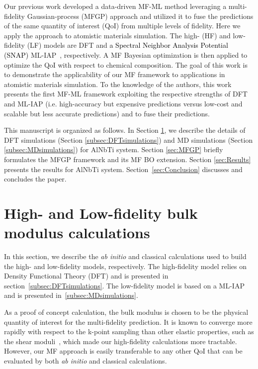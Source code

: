 \documentclass[%
 reprint,
aip,jcp
]{revtex4-1}
\newcommand{\review}[1]{\textcolor{black}{#1}}
\begin{document}
Our previous work developed a data-driven MF-ML method leveraging a
multi-fidelity Gaussian-process (MFGP) approach 
\cite{tran2019sbfbo2cogp,tran2020smfbo2cogp}
and utilized it to fuse the predictions of the same quantity of interest 
(QoI) from multiple levels of fidelity. 
Here we apply the approach to atomistic materials simulation.
The high- (HF) and low-fidelity (LF) models are 
DFT and \review{a Spectral Neighbor Analysis Potential (SNAP)} 
ML-IAP~\cite{thompson2015spectral}, respectively. 
A MF Bayesian optimization is then applied to optimize the QoI with 
respect to chemical composition. 
The goal of this work is to demonstrate the applicability of our 
MF framework to applications in atomistic materials simulation.
To the knowledge of the authors, this work presents the first 
MF-ML framework exploiting the respective strengths of DFT and ML-IAP
(i.e. high-accuracy but expensive predictions versus low-cost and 
scalable but less accurate predictions) and to fuse their predictions.

This manuscript is organized as follows. 
In Section \ref{sec:Simulations}, we describe the details of DFT 
simulations (Section \ref{subsec:DFTsimulations}) and MD simulations 
(Section \ref{subsec:MDsimulations}) for AlNbTi system. 
Section \ref{sec:MFGP} briefly formulates the MFGP framework and its MF 
BO extension. 
Section \ref{sec:Results} presents the results for AlNbTi system. 
Section~\ref{sec:Conclusion} discusses and concludes the paper.


\section{High- and Low-fidelity bulk modulus calculations}
\label{sec:Simulations}

In this section, we describe the \emph{ab initio} and classical 
calculations used to build the high- and low-fidelity models, 
respectively. 
The high-fidelity model relies on Density Functional Theory (DFT)
and is presented in section~\ref{subsec:DFTsimulations}.
The low-fidelity model is based on a ML-IAP and is presented 
in~\ref{subsec:MDsimulations}.

As a proof of concept calculation, the bulk modulus is chosen to
be the physical quantity of interest for the multi-fidelity prediction.
It is known to converge more rapidly with respect to the
k-point sampling than other elastic properties, such as the shear 
moduli~\cite{mattsson2004designing},
which made our high-fidelity calculations more tractable. 
However, our MF approach is easily transferable to any other
QoI that can be evaluated by both \emph{ab initio} and classical
calculations. 
\end{document}
